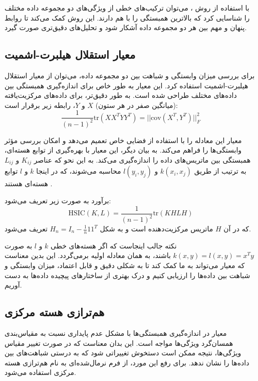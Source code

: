 با استفاده از روش
%
، می‌توان ترکیب‌های خطی از ویژگی‌های دو مجموعه داده مختلف را شناسایی کرد که بالاترین همبستگی را با هم دارند. این روش کمک می‌کند تا روابط پنهان و مهم بین هر دو مجموعه داده آشکار شود و تحلیل‌های دقیق‌تری صورت گیرد.







\subsection{
	معیار استقلال هیلبرت-اشمیت%
	}
برای بررسی میزان وابستگی و شباهت بین دو مجموعه داده، می‌توان از معیار استقلال هیلبرت-اشمیت استفاده کرد. این معیار به طور خاص برای اندازه‌گیری همبستگی بین داده‌های مختلف طراحی شده است. به طور دقیق‌تر، برای داده‌های مرکزیت‌یافته (میانگین صفر در هر ستون) \(X\) و \(Y\)، رابطه زیر برقرار است:
\begin{equation}
	\frac{1}{(n - 1)^2} \text{tr}(XX^TYY^T) = ||\text{cov}(X^T, Y^T)||_F^2
\end{equation}

معیار
این معادله را با استفاده از فضایی خاص تعمیم می‌دهد و امکان بررسی مؤثر وابستگی‌ها را فراهم می‌کند. به بیان دیگر، این معیار با بهره‌گیری از توابع هسته‌ای، همبستگی بین ماتریس‌های داده را اندازه‌گیری می‌کند. به این نحو که عناصر \(K_{ij}\) و \(L_{ij}\) به ترتیب از طریق \(k(x_i, x_j)\) و \(l(y_i, y_j)\) محاسبه می‌شوند، که در اینجا \(k\) و \(l\) توابع هسته‌ای هستند
\cite{gretton2005measuring}.

برآورد
به صورت زیر تعریف می‌شود:
\begin{equation}
	\text{HSIC}(K, L) = \frac{1}{(n - 1)^2} \text{tr}(KHLH)
	\label{eq_HSIC}
\end{equation}
که در آن
\(H\)
ماتریس مرکزیت‌دهنده است و به شکل \(H_n = I_n - \frac{1}{n} 11^T\) تعریف می‌شود.

نکته جالب اینجاست که اگر هسته‌های خطی \(k\) و \(l\) به صورت \(k(x, y) = l(x, y) = x^Ty\) باشند،
به همان معادله اولیه برمی‌گردد. این بدین معناست که معیار
می‌تواند به ما کمک کند تا به شکلی دقیق و قابل اعتماد، میزان وابستگی و شباهت بین داده‌ها را ارزیابی کنیم و درک بهتری از ساختارهای پیچیده داده‌ها به دست آوریم.


\subsection{
	هم‌ترازی هسته مرکزی%
}
معیار
در اندازه‌گیری همبستگی‌ها با مشکل عدم پایداری نسبت به مقیاس‌بندی همسان‌گرد ویژگی‌ها مواجه است. این بدان معناست که در صورت تغییر مقیاس ویژگی‌ها، نتیجه
ممکن است دستخوش تغییراتی شود که به درستی شباهت‌های بین داده‌ها را نشان ندهد. برای رفع این مورد، از فرم نرمال‌شده‌ای به نام هم‌ترازی هسته مرکزی استفاده می‌شود.


